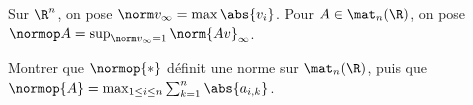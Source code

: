 \begin{enonce}
\begin{exercise}[ID={RMS 122 E855},subtitle={},tags={}]
  Sur $\R^n$, on pose $\norm v_\infty=\max\abs{v_i}$.
  Pour $A\in\mat_n(\R)$, on pose $\normop A=\sup_{\norm v_\infty=1} \norm{ Av}_\infty$.

  Montrer que $\normop{*}$ définit une norme sur $\mat_n(\R)$, puis que $\normop{A}=\max_{1\leq i\leq n} \sum_{k=1}^n \abs{a_{i,k}}$.
\end{exercise}
\begin{solution}
\end{solution}
\end{enonce}
